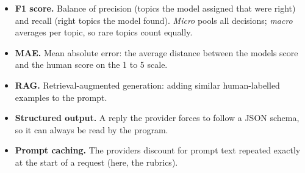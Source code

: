 \documentclass[
  11pt,
]{article}
\providecommand{\tightlist}{%
  \setlength{\itemsep}{0pt}\setlength{\parskip}{0pt}}
\begin{document}
\begin{itemize}
\tightlist
\item
  \textbf{F1 score.} Balance of precision (topics the model assigned that were
  right) and recall (right topics the model found). \emph{Micro} pools all
  decisions; \emph{macro} averages per topic, so rare topics count equally.
\item
  \textbf{MAE.} Mean absolute error: the average distance between the
  model\textquotesingle s score and the human score on the 1 to 5 scale.
\item
  \textbf{RAG.} Retrieval-augmented generation: adding similar human-labelled
  examples to the prompt.
\item
  \textbf{Structured output.} A reply the provider forces to follow a JSON
  schema, so it can always be read by the program.
\item
  \textbf{Prompt caching.} The provider\textquotesingle s discount for prompt
  text repeated exactly at the start of a request (here, the rubrics).
\end{itemize}
\end{document}
